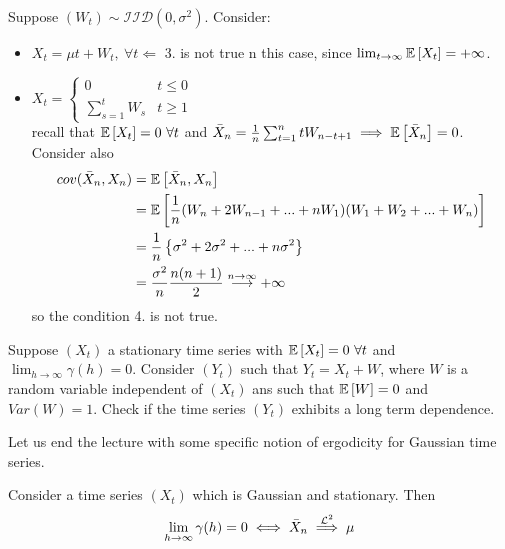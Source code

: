 \begin{example}
    Suppose $(W_t)\sim\mathcal{IID}(0,\sigma^2)$. Consider:
    \begin{itemize}
        \item $X_t=\mu t+W_t,\ \forall t\Leftarrow$ 3. is not true n this case, since $\lim_{t\to\infty}\mathbb{E}\left[X_t\right]=+\infty$.
        \item $X_t=\begin{cases}0&t\le0\\\sum_{s=1}^tW_s&t\ge1\end{cases}$\\recall that $\expect{X_t}=0\ \forall t$ and $\bar{X}_n=\frac{1}{n}\sum_{t=1}^ntW_{n-t+1}\implies\mathbb{E}\left[\bar{X}_n\right]=0$. Consider also 
        \begin{equation*}
            \begin{split}
                cov(\bar{X}_n,X_n)&=\mathbb{E}\left[\bar{X}_n,X_n\right]\\
                &=\mathbb{E}\left[\frac{1}{n}(W_n+2W_{n-1}+...+nW_1)(W_1+W_2+...+W_n)\right]\\
                &=\frac{1}{n}\left\{\sigma^2+2\sigma^2+...+n\sigma^2\right\}\\
                &=\frac{\sigma^2}{n}\frac{n(n+1)}{2}\stackrel{n\to\infty}{\longrightarrow}+\infty\\
            \end{split}
        \end{equation*}
        so the condition 4. is not true.
    \end{itemize}
\end{example}

\begin{exercise}
    Suppose $(X_t)$ a stationary time series with $\expect{X_t}=0\ \forall t$ and $\lim_{h\to\infty}\gamma(h)=0$. Consider $(Y_t)$ such that $Y_t=X_t+W$, where $W$ is a random variable independent of $(X_t)$ ans such that $\mathbb{E}\left[W\right]=0$ and $Var(W)=1$. Check if the time series $(Y_t)$ exhibits a long term dependence.
\end{exercise}

Let us end the lecture with some specific notion of ergodicity for Gaussian time series.

\begin{theorem}
    Consider a time series $(X_t)$ which is Gaussian and stationary. Then
    \[
        \lim_{h\to\infty}\gamma(h)=0\iff\bar{X}_n\stackrel{\mathcal{L}^{2}}{\implies}\mu  
    \]
\end{theorem}

